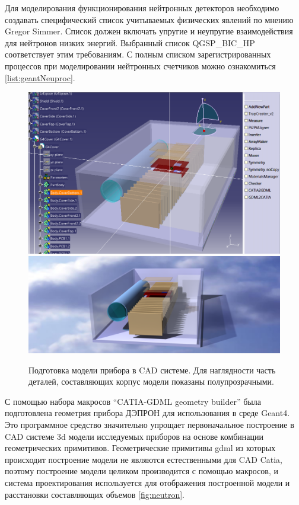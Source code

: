 Для моделирования функционирования нейтронных детекторов необходимо создавать специфический список учитываемых физических явлений по мнению Gregor Simmer\cite{Simmer2007}. Список должен включать упругие и неупругие взаимодействия для нейтронов низких энергий. Выбранный список QGSP\_BIC\_HP соответствует этим требованиям. С полным списком зарегистрированных процессов при моделировании нейтронных счетчиков можно ознакомиться \ref{list:geantNeuproc}.
\begin{figure}
	\centering
	\includegraphics[width=0.49\linewidth]{images/deproncatia2}
	\includegraphics[width=0.49\linewidth]{images/deproncatia}
	\caption[Модель прибора ДЭПРОН]{Подготовка модели прибора в CAD системе. Для наглядности часть деталей, составляющих корпус модели показаны полупрозрачными. }
	\label{fig:deproncatia2}
\end{figure}

С помощью набора макросов ``CATIA-GDML geometry builder''\cite{Belogurov2011a,Belogurov2014} была подготовлена геометрия прибора ДЭПРОН для использования в среде Geant4. Это программное средство значительно упрощает первоначальное построение в CAD системе 3d модели исследуемых приборов на основе комбинации геометрических примитивов. Геометрические примитивы gdml из которых происходит построение модели не являются естественными для CAD Catia, поэтому построение модели целиком производится с помощью макросов, и система проектирования используется для отображения построенной модели и расстановки составляющих объемов \ref{fig:neutron}.


